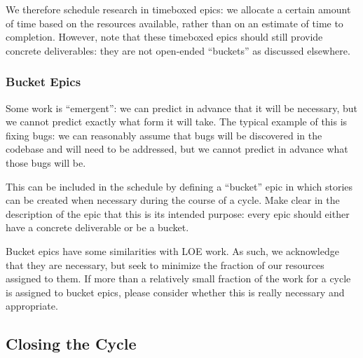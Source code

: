 \begin{itemize}
We therefore schedule research in \gls{timebox}ed \glspl{epic}: we allocate a certain amount of time based on the resources available, rather than on an estimate of time to completion.
However, note that these \gls{timebox}ed \glspl{epic} should still provide concrete deliverables: they are not open-ended ``buckets'' as discussed elsewhere.

\subsubsection{Bucket Epics} \label{sec:bucket}

Some work is ``emergent'': we can predict in advance that it will be necessary, but we cannot predict exactly what form it will take.
The typical example of this is fixing bugs: we can reasonably assume that bugs will be discovered in the codebase and will need to be addressed, but we cannot predict in advance what those bugs will be.

This can be included in the schedule by defining a ``bucket'' \gls{epic} in which stories can be created when necessary during the course of a \gls{cycle}.
Make clear in the description of the \gls{epic} that this is its intended purpose: every \gls{epic} should either have a concrete deliverable or be a bucket.

Bucket \glspl{epic} have some similarities with \gls{LOE} work.
As such, we acknowledge that they are necessary, but seek to minimize the fraction of our resources assigned to them.
If more than a relatively small fraction of the work for a \gls{cycle} is assigned to bucket \glspl{epic}, please consider whether this is really necessary and appropriate.



\subsection{Closing the Cycle} \label{sec:cycle-close}


\end{itemize}
